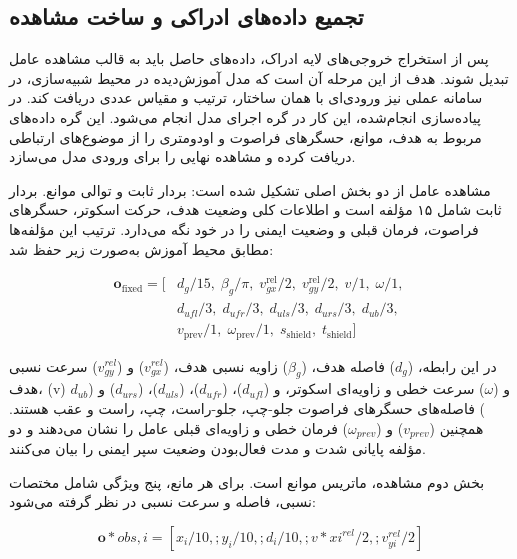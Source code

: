 \subsection{تجمیع داده‌های ادراکی و ساخت مشاهده}
\label{subsec:real_observation_construction}

پس از استخراج خروجی‌های لایه ادراک، داده‌های حاصل باید به قالب مشاهده عامل تبدیل شوند. هدف از این مرحله آن است که مدل آموزش‌دیده در محیط شبیه‌سازی، در سامانه عملی نیز ورودی‌ای با همان ساختار، ترتیب و مقیاس عددی دریافت کند. در پیاده‌سازی انجام‌شده، این کار در گره اجرای مدل انجام می‌شود. این گره داده‌های مربوط به هدف، موانع، حسگرهای فراصوت و اودومتری را از موضوع‌های ارتباطی  دریافت کرده و مشاهده نهایی را برای ورودی مدل  می‌سازد.

مشاهده عامل از دو بخش اصلی تشکیل شده است: بردار ثابت و توالی موانع. بردار ثابت شامل ۱۵ مؤلفه است و اطلاعات کلی وضعیت هدف، حرکت اسکوتر، حسگرهای فراصوت، فرمان قبلی و وضعیت ایمنی را در خود نگه می‌دارد. ترتیب این مؤلفه‌ها مطابق محیط آموزش به‌صورت زیر حفظ شد:

\begin{equation}
	\begin{aligned}
		\mathbf{o}_{\mathrm{fixed}} =
		[&
		d_g/15,\;
		\beta_g/\pi,\;
		v_{gx}^{\mathrm{rel}}/2,\;
		v_{gy}^{\mathrm{rel}}/2,\;
		v/1,\;
		\omega/1,\;\\
		&
		d_{ufl}/3,\;
		d_{ufr}/3,\;
		d_{uls}/3,\;
		d_{urs}/3,\;
		d_{ub}/3,\;\\
		&
		v_{\mathrm{prev}}/1,\;
		\omega_{\mathrm{prev}}/1,\;
		s_{\mathrm{shield}},\;
		t_{\mathrm{shield}}
		]
	\end{aligned}
	\label{eq:real_fixed_observation_vector}
\end{equation}

در این رابطه، ($d_g$) فاصله هدف، ($\beta_g$) زاویه نسبی هدف، ($ v_{gx}^{rel} $) و ($ v_{gy}^{rel} $) سرعت نسبی هدف، (v) و ($\omega$) سرعت خطی و زاویه‌ای اسکوتر، و ($d_{ufl}$)، ($d_{ufr}$)، ($d_{uls}$)، ($d_{urs}$) و ($d_{ub}$) فاصله‌های حسگرهای فراصوت جلو-چپ، جلو-راست، چپ، راست و عقب هستند. همچنین ($v_{prev}$) و ($\omega_{prev}$) فرمان خطی و زاویه‌ای قبلی عامل را نشان می‌دهند و دو مؤلفه پایانی شدت و مدت فعال‌بودن وضعیت سپر ایمنی را بیان می‌کنند.

بخش دوم مشاهده، ماتریس موانع است. برای هر مانع، پنج ویژگی شامل مختصات نسبی، فاصله و سرعت نسبی در نظر گرفته می‌شود:

\begin{equation}
	\mathbf{o}*{obs,i} =
	[
	x_i/10,;
	y_i/10,;
	d_i/10,;
	v*{xi}^{rel}/2,;
	v_{yi}^{rel}/2
	]
	\label{eq:real_obstacle_observation_vector}
\end{equation}


